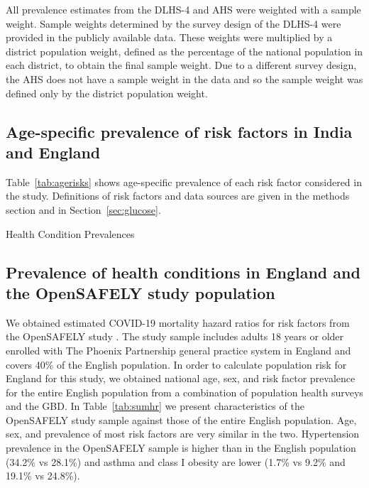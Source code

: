 \documentclass[10pt,letterpaper]{article}
\numberwithin{equation}{section}
\begin{document}
All prevalence estimates from the DLHS-4 and AHS were weighted with a sample weight. Sample weights determined by the survey design of the DLHS-4 were provided in the publicly available data. These weights were multiplied by a district population weight, defined as the percentage of the national population in each district, to obtain the final sample weight. Due to a different survey design, the AHS does not have a sample weight in the data and so the sample weight was defined only by the district population weight.

\subsection{Age-specific prevalence of risk factors in India and England}

Table~\ref{tab:agerisks} shows age-specific prevalence of each risk factor considered in the study. Definitions of risk factors and data sources are given in the methods section and in Section~\ref{sec:glucose}.

\begin{landscape}
  \begin{table}[H]
    \begin{center}
      \caption{Health Condition Prevalences}
      \label{tab:agerisks}
      
      
    \end{center}
  \end{table}
\end{landscape}

\clearpage
\subsection{Prevalence of health conditions in England and the OpenSAFELY study population}
We obtained estimated COVID-19 mortality hazard ratios for risk factors from the OpenSAFELY study \cite{williamson_opensafely_2020}. The study sample includes adults 18 years or older enrolled with The Phoenix Partnership general practice system in England and covers 40\% of the English population. In order to calculate population risk for England for this study, we obtained national age, sex, and risk factor prevalence for the entire English population from a combination of population health surveys and the GBD. In Table~\ref{tab:sumhr} we present characteristics of the OpenSAFELY study sample against those of the entire English population. Age, sex, and prevalence of most risk factors are very similar in the two. Hypertension prevalence in the OpenSAFELY sample is higher than in the English population (\num{34.2}\% vs \num{28.1}\%) and asthma and class I obesity are lower (\num{1.7}\% vs \num{9.2}\% and \num{19.1}\% vs \num{24.8}\%).
\end{document}
